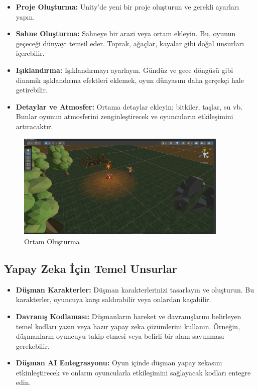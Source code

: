 \documentclass{article}
\begin{document}
\begin{itemize}
\item \textbf{Proje Oluşturma:} Unity'de yeni bir proje oluşturun ve gerekli ayarları yapın.
\item \textbf{Sahne Oluşturma:} Sahneye bir arazi veya ortam ekleyin. Bu, oyunun geçeceği dünyayı temsil eder. Toprak, ağaçlar, kayalar gibi doğal unsurları içerebilir.
\item \textbf{Işıklandırma:} Işıklandırmayı ayarlayın. Gündüz ve gece döngüsü gibi dinamik ışıklandırma efektleri eklemek, oyun dünyasını daha gerçekçi hale getirebilir.
\item \textbf{Detaylar ve Atmosfer:} Ortama detaylar ekleyin; bitkiler, taşlar, su vb. Bunlar oyunun atmosferini zenginleştirecek ve oyuncuların etkileşimini artıracaktır.
\end{itemize}

\begin{figure}[h]
    \centering
    \includegraphics[width=0.9\textwidth]{unityortam.PNG}
    \caption{Ortam Oluşturma}
    \label{fig:resim8}
\end{figure}

\subsection{Yapay Zeka İçin Temel Unsurlar}
\begin{itemize}
\item \textbf{Düşman Karakterler:} Düşman karakterlerinizi tasarlayın ve oluşturun. Bu karakterler, oyuncuya karşı saldırabilir veya onlardan kaçabilir.
\item \textbf{Davranış Kodlaması:} Düşmanların hareket ve davranışlarını belirleyen temel kodları yazın veya hazır yapay zeka çözümlerini kullanın. Örneğin, düşmanların oyuncuyu takip etmesi veya belirli bir alanı savunması gerekebilir.
\item \textbf{Düşman AI Entegrasyonu:} Oyun içinde düşman yapay zekasını etkinleştirecek ve onların oyuncularla etkileşimini sağlayacak kodları entegre edin.
\end{itemize}
\end{document}

